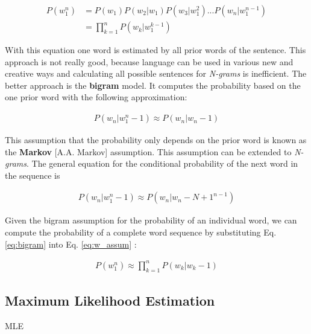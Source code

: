 \begin{equation}\label{eq:w_assum}
\begin{split}
P(w_1^{n}) & = P(w_1)P(w_2|w_1)P(w_3|w_1^{2})...P(w_n|w_1^{n-1}) \\
& = \prod_{k=1}^{n} P(w_k|w_1^{k-1})
\end{split}
\end{equation}

With this equation one word is estimated by all prior words of the sentence. This approach is not really good, because language can be used in various new and creative ways and calculating all possible sentences for \textit{N-grams} is inefficient. The better approach is the \textbf{bigram} model. It computes the probability based on the one prior word with the following approximation:

\begin{equation}\label{eq:bigram}
\begin{split}
P(w_n|w_1^n-1) \approx P(w_n|w_n-1)
\end{split}
\end{equation}

This assumption that the probability only depends on the prior word is known as the \textbf{Markov} [A.A. Markov] assumption. This assumption can be extended to \textit{N-grams}. The general equation for the conditional probability of the next word in the sequence is

\begin{equation}
\begin{split}
P(w_n|w_1^n-1) \approx P(w_n|w_n-N+1^{n-1})
\end{split}
\end{equation}

Given the bigram assumption for the probability of an individual word, we can
compute the probability of a complete word sequence by substituting Eq. \ref{eq:bigram} into
Eq. \ref{eq:w_assum} \cite{LM}:


\begin{equation} 
\begin{split}
P(w_1^{n}) \approx \prod_{k=1}^{n} P(w_k|w_k-1)
\end{split}
\end{equation}

\subsection{Maximum Likelihood Estimation}

MLE

